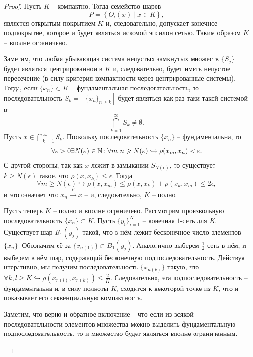 \begin{proof}
    Пусть $K$ -- компактно.
    Тогда семейство шаров
    \[
        P = \left\{O_\epsilon(x) \mid x \in K\right\},
    \]
    является открытым покрытием $K$ и, следовательно, допускает конечное подпокрытие, которое и будет являться искомой эпсилон сетью.
    Таким образом $K$ -- вполне ограничено.

    Заметим, что любая убывающая система непустых замкнутых множеств $\{S_j\}$ будет являться центрированной в $K$ и, следовательно, будет иметь непустое пересечение (в силу критерия компактности через центрированные системы).
    Тогда, если $\{x_n\} \subset K$ -- фундаментальная последовательность, то последовательность $S_k = [\{x_n\}_{n \geq k}]$ будет являться как раз-таки такой системой и
    \[
        \bigcap_{k = 1}^{\infty} S_k \neq \emptyset.
    \]
    Пусть $x \in \bigcap_{k = 1}^{\infty} S_k$.
    Поскольку последовательность $\{x_n\}$ -- фундаментальна, то
    \[
        \forall \varepsilon > 0 \exists N(\varepsilon) \in \mathbb{N}\colon \forall m, n \geqslant N(\varepsilon) \hookrightarrow \rho(x_m, x_n) < \varepsilon.
    \]
    С другой стороны, так как $x$ лежит в замыкании $S_{N(\epsilon)}$, то существует $k \geq N(\epsilon)$ такое, что $\rho(x, x_k) \leq \epsilon$.
    Тогда
    \[
        \forall m \geq N(\epsilon) \hookrightarrow \rho(x, x_m) \leq \rho(x, x_k) + \rho(x_k, x_m) \leq 2\epsilon,
    \]
    и это означает что $x_n \xrightarrow{\rho} x$ -- и, следовательно, $K$ -- полно.

    Пусть теперь $K$ -- полно и вполне ограничено.
    Рассмотрим произвольную последовательность $\{x_n\} \subset K$.
    Пусть $\{y_i\}_{i = 1}^{N}$ -- конечная $1$-сеть для $K$.
    Существует шар $B_1(y_j)$ такой, что в нём лежит бесконечное число элементов $\{x_n\}$.
    Обозначим её за $\{x_{n(1)}\} \subset B_1(y_j)$.
    Аналогично выберем $\frac{1}{2}$-сеть в нём, и выберем в нём шар, содержащий бесконечную подпоследовательность.
    Действуя итеративно, мы получим последовательность $\{x_{n(k)}\}$ такую, что $\forall k, l \geq K \hookrightarrow \rho(x_{n(l)}, x_{n(k)}) \leq \frac{2}{K}$.
    Следовательно, эта подпоследовательность -- фундаментальна и, в силу полноты $K$, сходится к некоторой точке из $K$, что и показывает его секвенциальную компактность.

    \begin{note}
        Заметим, что верно и обратное включение -- что если из всякой последовательности элементов множества можно выделить фундаментальную подпоследовательность, то и множество будет являться вполне ограниченным.


\end{note}
\end{proof}
